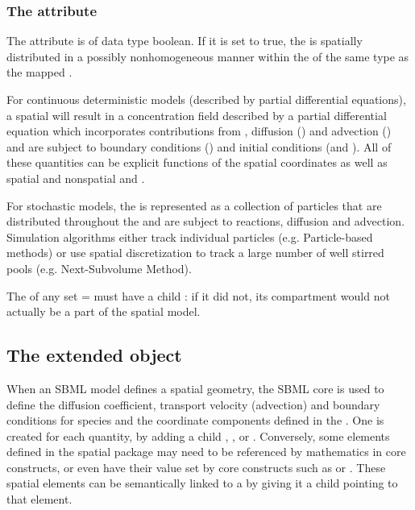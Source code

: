 \subsubsection{The \fixttspace{} attribute}
The  attribute is of data type boolean. If it is set to true, the \Species is spatially distributed in a possibly nonhomogeneous manner within the \Domains of the same type as the mapped \DomainType. 

For continuous deterministic models (described by partial differential equations), a spatial \Species will result in a concentration field described by a partial differential equation which incorporates contributions from \Reactions, diffusion (\DiffusionCoefficient) and advection (\AdvectionCoefficient) and are subject to boundary conditions (\BoundaryCondition) and initial conditions (\InitialAssignment and \Rule).  All of these quantities can be explicit functions of the spatial coordinates as well as spatial and nonspatial \Parameters and \Species.  

For stochastic models, the \Species is represented as a collection of particles that are distributed throughout the \Domains and are subject to reactions, diffusion and advection.  Simulation algorithms either track individual particles (e.g. Particle-based methods) or use spatial discretization to track a large number of well stirred pools (e.g. Next-Subvolume Method).

The  of any \Species set  =  must have a child \CompartmentMapping: if it did not, its compartment would not actually be a part of the spatial model.


\subsection{The extended \Parameter object}
\label{extended-parameter-class}
When an SBML model defines a spatial geometry, the SBML core \Parameter is used to define the diffusion coefficient, transport velocity (advection) and boundary conditions for species and the coordinate components defined in the \Geometry. One \Parameter is created for each quantity, by adding a child \DiffusionCoefficient, \AdvectionCoefficient, or \BoundaryCondition.  Conversely, some elements defined in the spatial package may need to be referenced by mathematics in core constructs, or even have their value set by core constructs such as \InitialAssignment or \Rule.  These spatial elements can be semantically linked to a \Parameter by giving it a child \SpatialSymbolReference pointing to that element.

